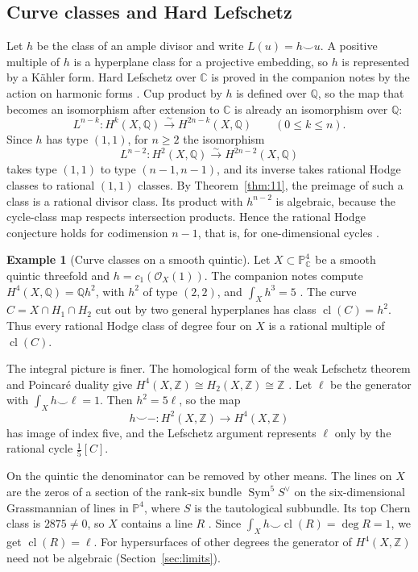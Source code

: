 \documentclass[11pt,reqno]{amsart}
\theoremstyle{definition}
\newtheorem{example}[theorem]{Example}
\theoremstyle{remark}
\numberwithin{equation}{section}
\newcommand{\C}{\mathbb{C}}
\newcommand{\Z}{\mathbb{Z}}
\newcommand{\Q}{\mathbb{Q}}
\newcommand{\PP}{\mathbb{P}}
\newcommand{\OO}{\mathcal{O}}
\DeclareMathOperator{\cl}{cl}
\begin{document}
\subsection{Curve classes and Hard Lefschetz}

Let $h$ be the class of an ample divisor and write $L(u)=h\smile u$.
A positive multiple of $h$ is a hyperplane class for a projective
embedding, so $h$ is represented by a K\"ahler form. Hard Lefschetz
over $\C$ is proved in the companion notes by the action on harmonic
forms \cite[\S7]{gaganotes}. Cup product by $h$ is defined over $\Q$,
so the map that becomes an isomorphism after extension to $\C$ is
already an isomorphism over $\Q$:
\begin{equation}\label{eq:HL}
 L^{n-k}:H^k(X,\Q)\xrightarrow{\sim}H^{2n-k}(X,\Q)
 \qquad(0\leq k\leq n).
\end{equation}
Since $h$ has type $(1,1)$, for $n\geq2$ the isomorphism
\[
 L^{n-2}:H^2(X,\Q)\xrightarrow{\sim}H^{2n-2}(X,\Q)
\]
takes type $(1,1)$ to type $(n-1,n-1)$, and its inverse takes rational
Hodge classes to rational $(1,1)$ classes. By Theorem~\ref{thm:11},
the preimage of such a class is a rational divisor class. Its product with
$h^{n-2}$ is algebraic, because the cycle-class map respects intersection
products. Hence the rational Hodge conjecture holds for codimension
$n-1$, that is, for one-dimensional cycles \cite{voisin2003hodge2}.

\begin{example}[Curve classes on a smooth quintic]
\label{ex:quintic}
Let $X\subset\PP^4_{\C}$ be a smooth quintic threefold and
$h=c_1(\OO_X(1))$. The companion notes compute
$H^4(X,\Q)=\Q h^2$, with $h^2$ of type $(2,2)$, and
$\int_X h^3=5$ \cite[\S8]{gaganotes}.
The curve $C=X\cap H_1\cap H_2$ cut out by two general hyperplanes
has class $\cl(C)=h^2$. Thus every rational Hodge class of degree four
on $X$ is a rational multiple of $\cl(C)$.

The integral picture is finer. The homological form of the weak Lefschetz
theorem and Poincar\'e duality give
$H^4(X,\Z)\cong H_2(X,\Z)\cong\Z$ \cite[Ch.~1]{voisin2003hodge2}. Let $\ell$ be the
generator with $\int_X h\smile\ell=1$. Then $h^2=5\ell$, so the map
\[
 h\smile{-}:H^2(X,\Z)\longrightarrow H^4(X,\Z)
\]
has image of index five, and the Lefschetz argument represents $\ell$ only
by the rational cycle $\tfrac15[C]$.

On the quintic the denominator can be removed by other means. The lines on
$X$ are the zeros of a section of the rank-six bundle
$\operatorname{Sym}^5S^\vee$ on the six-dimensional Grassmannian of lines
in $\PP^4$, where $S$ is the tautological subbundle. Its top Chern class is
$2875\neq0$, so $X$ contains a line $R$ \cite[Ch.~6]{eisenbudharris2016}.
Since $\int_X h\smile\cl(R)=\deg R=1$, we get $\cl(R)=\ell$. For
hypersurfaces of other degrees the generator of $H^4(X,\Z)$ need not be
algebraic (Section~\ref{sec:limits}).
\end{example}
\end{document}
